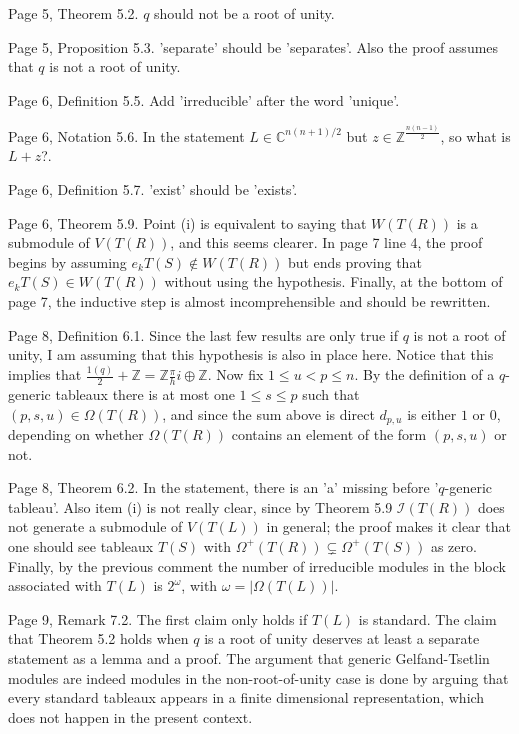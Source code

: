 \documentclass[11pt,fleqn]{article}
\newcommand\CC{\mathbb C}
\newcommand\ZZ{\mathbb Z}
\begin{document}
Page 5, Theorem 5.2. $q$ should not be a root of unity.

Page 5, Proposition 5.3. 'separate' should be 'separates'. Also the proof 
assumes that $q$ is not a root of unity.

Page 6, Definition 5.5. Add 'irreducible' after the word 'unique'.

Page 6, Notation 5.6. In the statement $L \in \CC^{n(n+1)/2}$ but $z \in 
\ZZ^{\frac{n(n-1)}{2}}$, so what is $L+z$?. 

Page 6, Definition 5.7. 'exist' should be 'exists'.

Page 6, Theorem 5.9. Point (i) is equivalent to saying that $W(T(R))$ is a 
submodule of $V(T(R))$, and this seems clearer. In 
page 7 line 4, the proof begins by assuming $e_k T(S) \notin W(T(R))$ but ends
proving that $e_k T(S) \in W(T(R))$ without using the hypothesis. Finally, 
at the bottom of page 7, the inductive step is almost incomprehensible and 
should be rewritten.

Page 8, Definition 6.1. Since the last few results are only true if $q$ is not
a root of unity, I am assuming that this hypothesis is also in place here. 
Notice that this implies that $\frac{1(q)}{2} + \ZZ = \ZZ\frac{\pi}{h}i \oplus 
\ZZ$. Now fix $1 \leq u < p \leq n$. By the definition of a 
$q$-generic tableaux there is at most one $1 \leq s \leq p$ such that
$(p,s,u) \in \Omega(T(R))$, and since the sum above is direct $d_{p,u}$ is 
either $1$ or $0$, depending on whether $\Omega(T(R))$ contains an element of 
the form $(p,s,u)$ or not.

Page 8, Theorem 6.2. In the statement, there is an 'a' missing before 
'$q$-generic tableau'. Also item (i) is not really clear, since by Theorem 5.9 
$\mathcal I(T(R))$ does not generate a submodule of $V(T(L))$ in general; the 
proof makes it clear that one should see tableaux $T(S)$ with $\Omega^+(T(R))
\subsetneq \Omega^+(T(S))$ as zero. Finally, by the previous comment the number
of irreducible modules in the block associated with $T(L)$ is $2^\omega$, with
$\omega = | \Omega(T(L))|$.

Page 9, Remark 7.2. The first claim only holds if $T(L)$ is standard. 
The claim that Theorem 5.2 holds when $q$ is a root of unity deserves at least 
a separate statement as a lemma and a proof. The argument that generic 
Gelfand-Tsetlin modules are indeed modules in the non-root-of-unity case is 
done by arguing that every standard tableaux appears in a finite dimensional 
representation, which does not happen in the present context.
\end{document}

